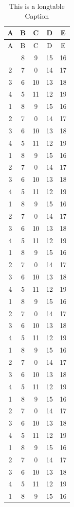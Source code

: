 \documentclass[12pt]{report} %
\begin{document}
\begin{longtable}{|c|ccc|c|}
\caption{This is a longtable Caption}\\
\hline
A & B & C & D & E\\
\hline
\endfirsthead
\hline
A & B & C & D  & E\\
\hline
\endhead
\hline
\endfoot
1&  8&  9&  15& 16\\
2&  7&  0&  14& 17\\
3&  6&  10&  13& 18\\
4&  5&  11&  12& 19\\
1&  8&  9&  15& 16\\
2&  7&  0&  14& 17\\
3&  6&  10&  13& 18\\
4&  5&  11&  12& 19\\
1&  8&  9&  15& 16\\
2&  7&  0&  14& 17\\
3&  6&  10&  13& 18\\
4&  5&  11&  12& 19\\
1&  8&  9&  15& 16\\
2&  7&  0&  14& 17\\
3&  6&  10&  13& 18\\
4&  5&  11&  12& 19\\
1&  8&  9&  15& 16\\\hline
2&  7&  0&  14& 17\\
3&  6&  10&  13& 18\\
4&  5&  11&  12& 19\\
1&  8&  9&  15& 16\\
2&  7&  0&  14& 17\\
3&  6&  10&  13& 18\\
4&  5&  11&  12& 19\\
1&  8&  9&  15& 16\\
2&  7&  0&  14& 17\\
3&  6&  10&  13& 18\\
4&  5&  11&  12& 19\\
1&  8&  9&  15& 16\\
2&  7&  0&  14& 17\\ \hline
3&  6&  10&  13& 18\\
4&  5&  11&  12& 19\\
1&  8&  9&  15& 16\\
2&  7&  0&  14& 17\\
3&  6&  10&  13& 18\\
4&  5&  11&  12& 19\\
1&  8&  9&  15& 16\\

\end{longtable}
\end{document}
